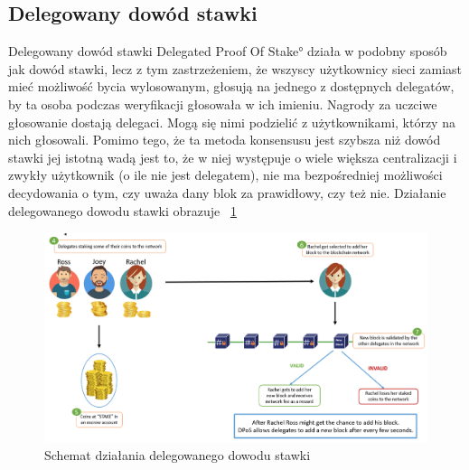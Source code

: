 \subsection{Delegowany dowód stawki}
\label{ssec:DPoS}

Delegowany dowód stawki \ang{Delegated Proof Of Stake} działa w podobny sposób jak dowód stawki, lecz z tym zastrzeżeniem, że wszyscy użytkownicy sieci zamiast mieć możliwość bycia wylosowanym, głosują na jednego z dostępnych delegatów, by ta osoba podczas weryfikacji głosowała w ich imieniu. Nagrody za uczciwe głosowanie dostają delegaci. Mogą się nimi podzielić z użytkownikami, którzy na nich głosowali. Pomimo tego, że ta metoda konsensusu jest szybsza niż dowód stawki jej istotną wadą jest to, że w niej występuje o wiele większa centralizacji i zwykły użytkownik (o ile nie jest delegatem), nie ma bezpośredniej możliwości decydowania o tym, czy uważa dany blok za prawidłowy, czy też nie.
Działanie delegowanego dowodu stawki obrazuje \figurename{~\ref{fig:ConsensusDPOS}}
\begin{figure}[ht]
    \centering
    \includegraphics[width=\textwidth]{Images/ConsensusDPOS.png}
    \caption{Schemat działania delegowanego dowodu stawki}
    \label{fig:ConsensusDPOS}
\end{figure}

